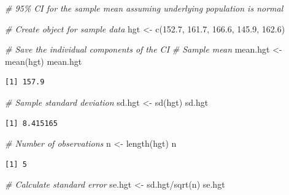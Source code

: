 \documentclass[
  oneside]{krantz}
\newenvironment{Shaded}{\begin{snugshade}}{\end{snugshade}}
\newcommand{\CommentTok}[1]{\textcolor[rgb]{0.56,0.35,0.01}{\textit{#1}}}
\newcommand{\FloatTok}[1]{\textcolor[rgb]{0.00,0.00,0.81}{#1}}
\newcommand{\FunctionTok}[1]{\textcolor[rgb]{0.00,0.00,0.00}{#1}}
\newcommand{\NormalTok}[1]{#1}
\newcommand{\OtherTok}[1]{\textcolor[rgb]{0.56,0.35,0.01}{#1}}
\newcommand{\SpecialCharTok}[1]{\textcolor[rgb]{0.00,0.00,0.00}{#1}}
\begin{document}
\begin{Shaded}
\begin{Highlighting}[]
\CommentTok{\# 95\% CI for the sample mean assuming underlying population is normal}

\CommentTok{\# Create object for sample data}
\NormalTok{hgt }\OtherTok{\textless{}{-}} \FunctionTok{c}\NormalTok{(}\FloatTok{152.7}\NormalTok{, }\FloatTok{161.7}\NormalTok{, }\FloatTok{166.6}\NormalTok{, }\FloatTok{145.9}\NormalTok{, }\FloatTok{162.6}\NormalTok{)}

\CommentTok{\# Save the individual components of the CI}
\CommentTok{\# Sample mean}
\NormalTok{mean.hgt }\OtherTok{\textless{}{-}} \FunctionTok{mean}\NormalTok{(hgt)}
\NormalTok{mean.hgt}
\end{Highlighting}
\end{Shaded}

\begin{verbatim}
[1] 157.9
\end{verbatim}

\begin{Shaded}
\begin{Highlighting}[]
\CommentTok{\# Sample standard deviation}
\NormalTok{sd.hgt }\OtherTok{\textless{}{-}} \FunctionTok{sd}\NormalTok{(hgt)}
\NormalTok{sd.hgt}
\end{Highlighting}
\end{Shaded}

\begin{verbatim}
[1] 8.415165
\end{verbatim}

\begin{Shaded}
\begin{Highlighting}[]
\CommentTok{\# Number of observations}
\NormalTok{n }\OtherTok{\textless{}{-}} \FunctionTok{length}\NormalTok{(hgt)}
\NormalTok{n}
\end{Highlighting}
\end{Shaded}

\begin{verbatim}
[1] 5
\end{verbatim}

\begin{Shaded}
\begin{Highlighting}[]
\CommentTok{\# Calculate standard error}
\NormalTok{se.hgt }\OtherTok{\textless{}{-}}\NormalTok{ sd.hgt}\SpecialCharTok{/}\FunctionTok{sqrt}\NormalTok{(n)}
\NormalTok{se.hgt}
\end{Highlighting}
\end{Shaded}
\end{document}
